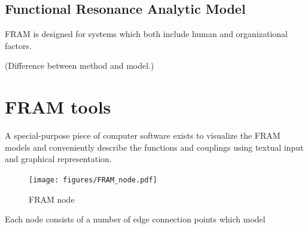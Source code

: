 \subsection{Functional Resonance Analytic Model}


FRAM is designed for systems which both include human and organizational factors.

(Difference between method and model.)


\section{FRAM tools}
A special-purpose piece of computer software exists to visualize the FRAM models and conveniently describe the functions and couplings using textual input and graphical representation.

\begin{figure}[h]
 \centering
   \texttt{[image: figures/FRAM\_node.pdf]}
 \caption{FRAM node}
 \label{fig:fram_node}
\end{figure}


Each node consists of a number of edge connection points  which model


